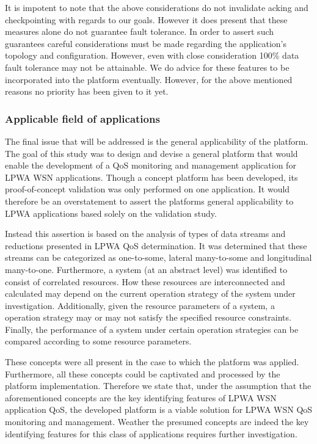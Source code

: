 It is impotent to note that the above considerations do not invalidate acking and checkpointing with regards to our goals. However it does present that these measures alone do not guarantee fault tolerance. In order to assert such guarantees careful considerations must be made regarding the application's topology and configuration. However, even with close consideration 100\% data fault tolerance may not be attainable. We do advice for these features to be incorporated into the platform eventually. However, for the above mentioned reasons no priority has been given to it yet.

\subsubsection{Applicable field of applications}
The final issue that will be addressed is the general applicability of the platform. The goal of this study was to design and devise a general platform that would enable the development of a QoS monitoring and management application for LPWA WSN applications. Though a concept platform has been developed, its proof-of-concept validation was only performed on one application. It would therefore be an overstatement to assert the platforms general applicability to LPWA applications based solely on the validation study.

Instead this assertion is based on the analysis of types of data streams and reductions presented in LPWA QoS determination. It was determined that these streams can be categorized as one-to-some, lateral many-to-some and longitudinal many-to-one. Furthermore, a system (at an abstract level) was identified to consist of correlated resources. How these resources are interconnected and calculated may depend on the current operation strategy of the system under investigation. Additionally, given the resource parameters of a system, a operation strategy may or may not satisfy the specified resource constraints. Finally, the performance of a system under certain operation strategies can be compared according to some resource parameters.

These concepts were all present in the case to which the platform was applied. Furthermore, all these concepts could be captivated and processed by the platform implementation. Therefore we state that, under the assumption that the aforementioned concepts are the key identifying features of LPWA WSN application QoS, the developed platform is a viable solution for LPWA WSN QoS monitoring and management. Weather the presumed concepts are indeed the key identifying features for this class of applications requires further investigation. 

